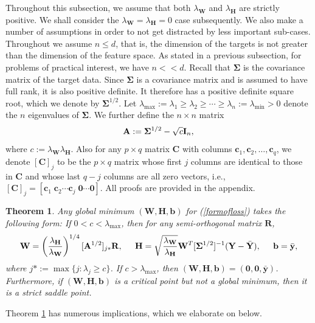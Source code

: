\documentclass{article}
\theoremstyle{plain}
\newtheorem{theorem}{Theorem}[section]
\theoremstyle{definition}
\theoremstyle{remark}
\newcommand{\bW}{{\mathbf W}}
\newcommand{\bY}{{\mathbf Y}}
\newcommand{\bR}{{\mathbf R}}
\newcommand{\bA}{{\mathbf A}}
\newcommand{\bH}{{\mathbf H}}
\newcommand{\bI}{{\mathbf I}}
\newcommand{\bC}{{\mathbf C}}
\newcommand{\bzero}{{\mathbf 0}}
\newcommand{\byb}{{\bar{\mathbf y}}}
\newcommand{\bYb}{{\bar{\mathbf Y}}}
\newcommand{\bb}{{\mathbf b}}
\newcommand{\bc}{{\mathbf c}}
\newcommand{\bSigma}{{\mathbf \Sigma}}
\newcommand{\lH}{\lambda_{\bH}}
\newcommand{\lW}{\lambda_{\bW}}
\begin{document}
Throughout this subsection, we assume that both $\lW$ and $\lH$ are strictly positive. We shall consider the $\lW = \lH = 0$ case subsequently. 
We also make a number of assumptions in order to not get distracted by less important sub-cases. 
Throughout we assume $n \leq d$, that is, the dimension of the targets is not greater than the dimension of the feature space. As stated in a previous subsection, for problems of practical interest, we have $n << d$.
Recall that $\bSigma$ is the covariance matrix of the target data. 
Since $\bSigma$ is a covariance matrix and is assumed to have full rank, it is also positive definite. It therefore has a positive definite square root, which we denote by $\bSigma^{1/2}$.  
Let $\lambda_{\max} := \lambda_1 \geq \lambda_2 \geq \cdots \geq \lambda_n := \lambda_{\min}> 0$ denote the $n$ eigenvalues of $\bSigma$. 
We further define the $n \times n$ matrix 
\begin{equation} \label{defofa}
{\bf A} := \bSigma^{1/2} -\sqrt{c}\bI_n,
\end{equation}
where $c := \lW \lH$. Also for any $p \times q$ matrix $\bC$ with columns $\bc_1, \bc_2,\ldots,\bc_q$, we denote $[\bC]_j$ to be 
the $p \times q$ matrix whose first $j$ columns are identical to those in $\bC$ and whose last $q-j$ columns are all zero vectors, i.e., $[\bC]_j = [\bc_1 \; \bc_2 \cdots\bc_j \; \bzero \cdots \bzero]$. All proofs are provided in the appendix. 
\begin{theorem} \label{gendim}  
Any global minimum $(\bW,\bH,\bb)$ for (\ref{formofloss}) takes the following form:
If $0 < c < \lambda_{\max}$, then for any semi-orthogonal matrix $\bR$,
\begin{equation} \label{optima1}
\bW  =  \left( {\frac{\lH}{\lW}} \right)^{1/4} [\bA^{1/2}]_{j*}\bR, \hspace{.2in}
\bH  =   \sqrt{\frac{\lW}{\lH}} \bW^{T}  [\bSigma^{1/2}]^{-1} (\bY - \bYb),
\hspace{.2in} \bb =  \byb,
\end{equation}
where $j* := \max \{ j : \lambda_j \geq c \}$.
If $c > \lambda_{\max}$, then $(\bW,\bH,\bb) = (\bzero,\bzero,\byb)$.
Furthermore, if $(\bW,\bH,\bb)$ is a critical point but not a global minimum, then it is a strict saddle point. 
\end{theorem}
Theorem \ref{gendim} has numerous implications, which we elaborate on below.
\end{document}
